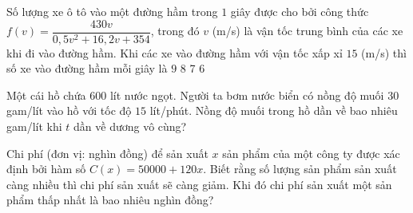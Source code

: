 \begin{ex}%
	Số lượng xe ô tô vào một đường hầm trong $1$ giây được cho bởi công thức $ f(v)=\dfrac{430v}{0{,}5v^2+16{,}2v+354}$, trong đó $v$ (m/s) là vận tốc trung bình của các xe khi đi vào đường hầm. Khi các xe vào đường hầm với vận tốc xấp xỉ $15$ (m/s) thì số xe vào  đường hầm mỗi giây là
	 \choice
		{\True $9$} 
		 {8}
		{7} 
		{6} 
\end{ex}



\begin{ex}%
	Một cái hồ chứa $600$  lít nước ngọt. Người ta bơm nước biển có nồng độ muối $30$ gam/lít vào hồ với tốc độ $15$ lít/phút. Nồng độ muối trong hồ dần về bao nhiêu gam/lít khi $t$ dần về dương vô cùng?
\end{ex}

\begin{ex}%
	Chi phí (đơn vị: nghìn đồng) để sản xuất $x$ sản phẩm của một công ty được xác định bởi hàm số $C(x)=50000+ 120x$. Biết rằng số lượng sản phẩm sản xuất càng nhiều thì chi phí sản xuất sẽ càng giảm. Khi đó chi phí sản xuất một sản phẩm  thấp nhất là bao nhiêu nghìn đồng?
\end{ex}

